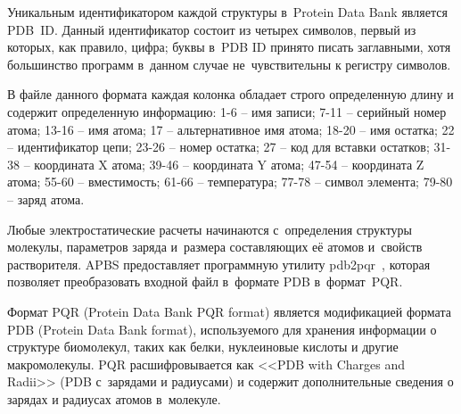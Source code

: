 


Уникальным идентификатором каждой структуры в~Protein Data Bank является PDB~ID. Данный идентификатор состоит из четырех символов, первый из которых, как правило, цифра; буквы в~PDB ID принято писать заглавными, хотя большинство программ в~данном случае не~чувствительны к регистру символов. 

В файле данного формата каждая колонка обладает строго определенную длину и содержит определенную информацию: 1-6 -- имя записи; 7-11 -- серийный номер атома; 13-16 -- имя атома; 17 -- альтернативное имя атома; 18-20 -- имя остатка; 22 -- идентификатор цепи; 23-26 -- номер остатка; 27 -- код для вставки остатков; 31-38 -- координата X атома; 39-46 -- координата Y атома; 47-54 -- координата Z атома; 55-60 -- вместимость; 61-66 -- температура; 77-78 -- символ элемента; 79-80 -- заряд атома.

Любые электростатические расчеты начинаются с~определения структуры молекулы, параметров заряда и~размера составляющих её атомов и~свойств растворителя. APBS предоставляет программную утилиту pdb2pqr~\cite{pdb2pqr}, которая позволяет преобразовать входной файл в~формате PDB в~формат~PQR.

Формат PQR (Protein Data Bank PQR format) является модификацией формата PDB (Protein Data Bank format), используемого для хранения информации о структуре биомолекул, таких как белки, нуклеиновые кислоты и другие макромолекулы. PQR расшифровывается как <<PDB with Charges and Radii>> (PDB с~зарядами и радиусами) и содержит дополнительные сведения о зарядах и радиусах атомов в~молекуле.

